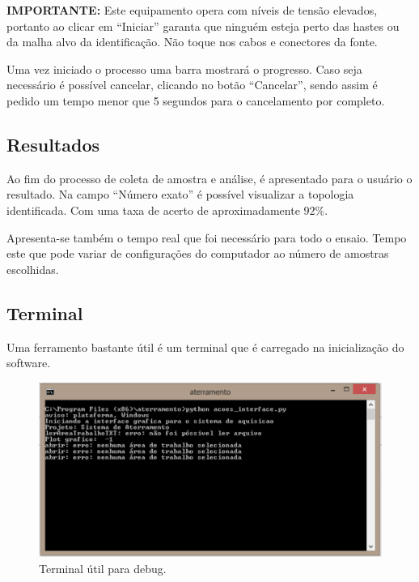 \documentclass[a4paper, 10pt]{article}
\begin{document}
\textbf{IMPORTANTE:} Este equipamento opera com níveis de tensão elevados, portanto ao clicar em 
``Iniciar'' garanta que ninguém esteja perto das hastes ou da malha alvo da identificação. Não toque
nos cabos e conectores da fonte.

Uma vez iniciado o processo uma barra mostrará o progresso. Caso seja necessário é possível cancelar, 
clicando no botão ``Cancelar'', sendo assim é pedido um tempo menor que 5 segundos para o cancelamento
por completo.

\subsection{Resultados}


Ao fim do processo de coleta de amostra e análise, é apresentado para o usuário o resultado. 
Na campo ``Número exato'' é possível visualizar a topologia identificada. Com uma taxa de 
acerto de aproximadamente $92 \%$.

Apresenta-se também o tempo real que foi necessário para todo o ensaio. Tempo este que pode variar
de configurações do computador  ao número de amostras escolhidas.

\subsection{Terminal}

Uma ferramento bastante útil é um terminal que é carregado na inicialização do software.

\begin{figure}[!h]
    \caption{\label{fig_terminal}Terminal útil para debug.}
	    \begin{center}
            \includegraphics[scale=0.3]{../fotos/execucao/terminal.pdf}
	    \end{center}
\end{figure}
\end{document}
